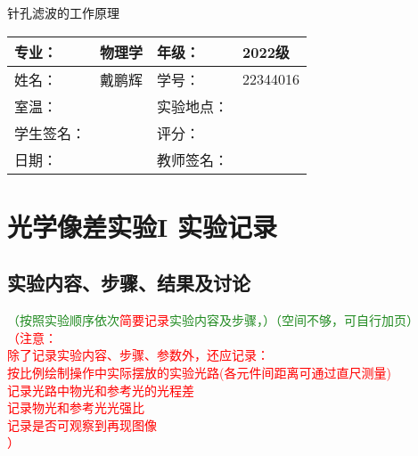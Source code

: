 \documentclass[dvipsnames, svgnames,a4paper,11pt]{article}
\begin{document}
	\begin{question}
		针孔滤波的工作原理
	\end{question}

\clearpage
\begin{table}
	\renewcommand\arraystretch{1.7}
	\centering
	\begin{tabularx}{\textwidth}{|X|X|X|X|}
	\hline
	专业：& 物理学 &年级：& 2022级 \\
	\hline
	姓名：& 戴鹏辉 & 学号：& 22344016 \\
	\hline
	室温：&  & 实验地点： &  \\
	\hline
	学生签名：& & 评分： &\\
	\hline
	日期：&  & 教师签名：&\\
	\hline
	\end{tabularx}
\end{table}

\section{光学像差实验I \quad\heiti 实验记录}
\subsection{实验内容、步骤、结果及讨论}\textcolor{ForestGreen}{（按照实验顺序依次}\textcolor{red}{简要记录}\textcolor{ForestGreen}{实验内容及步骤，）（空间不够，可自行加页）}\\
\textcolor{red}{
（注意： \\
除了记录实验内容、步骤、参数外，还应记录：\\
按比例绘制操作中实际摆放的实验光路(各元件间距离可通过直尺测量)\\
记录光路中物光和参考光的光程差\\
记录物光和参考光光强比\\
记录是否可观察到再现图像\\
）
}


		





\clearpage
\end{document}
